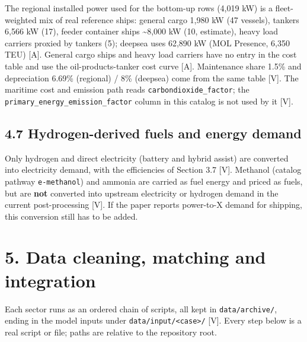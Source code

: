 \documentclass[11pt,a4paper]{article}
\begin{document}
The regional installed power used for the bottom-up rows (4,019 kW) is a fleet-weighted mix of real reference ships: general cargo 1,980 kW (47 vessels), tankers 6,566 kW (17), feeder container ships \textasciitilde{}8,000 kW (10, estimate), heavy load carriers proxied by tankers (5); deepsea uses 62,890 kW (MOL Presence, 6,350 TEU) [A]. General cargo ships and heavy load carriers have no entry in the cost table and use the oil-products-tanker cost curve [A]. Maintenance share 1.5\% and depreciation 6.69\% (regional) / 8\% (deepsea) come from the same table [V]. The maritime cost and emission path reads \texttt{carbondioxide\_\allowbreak{}factor}; the \texttt{primary\_\allowbreak{}energy\_\allowbreak{}emission\_\allowbreak{}factor} column in this catalog is not used by it [V].

\subsection*{4.7 Hydrogen-derived fuels and energy demand}

Only hydrogen and direct electricity (battery and hybrid assist) are converted into electricity demand, with the efficiencies of Section 3.7 [V]. Methanol (catalog pathway \texttt{e-methanol}) and ammonia are carried as fuel energy and priced as fuels, but are \textbf{not} converted into upstream electricity or hydrogen demand in the current post-processing [V]. If the paper reports power-to-X demand for shipping, this conversion still has to be added.

\section*{5. Data cleaning, matching and integration}

Each sector runs as an ordered chain of scripts, all kept in \texttt{data/\allowbreak{}archive/\allowbreak{}}, ending in the model inputs under \texttt{data/\allowbreak{}input/\allowbreak{}\textless{}case\textgreater{}/\allowbreak{}} [V]. Every step below is a real script or file; paths are relative to the repository root.
\end{document}
